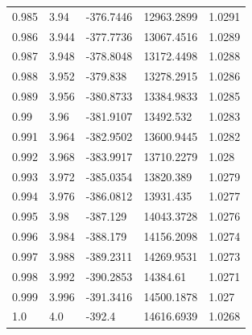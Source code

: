 \begin{tabular}{lllll}
0.985 & 3.94 & -376.7446 & 12963.2899 & 1.0291 \\
0.986 & 3.944 & -377.7736 & 13067.4516 & 1.0289 \\
0.987 & 3.948 & -378.8048 & 13172.4498 & 1.0288 \\
0.988 & 3.952 & -379.838 & 13278.2915 & 1.0286 \\
0.989 & 3.956 & -380.8733 & 13384.9833 & 1.0285 \\
0.99 & 3.96 & -381.9107 & 13492.532 & 1.0283 \\
0.991 & 3.964 & -382.9502 & 13600.9445 & 1.0282 \\
0.992 & 3.968 & -383.9917 & 13710.2279 & 1.028 \\
0.993 & 3.972 & -385.0354 & 13820.389 & 1.0279 \\
0.994 & 3.976 & -386.0812 & 13931.435 & 1.0277 \\
0.995 & 3.98 & -387.129 & 14043.3728 & 1.0276 \\
0.996 & 3.984 & -388.179 & 14156.2098 & 1.0274 \\
0.997 & 3.988 & -389.2311 & 14269.9531 & 1.0273 \\
0.998 & 3.992 & -390.2853 & 14384.61 & 1.0271 \\
0.999 & 3.996 & -391.3416 & 14500.1878 & 1.027 \\
1.0 & 4.0 & -392.4 & 14616.6939 & 1.0268 \\
\bottomrule
\end{tabular}

